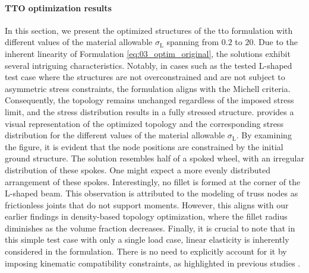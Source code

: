 \paragraph{TTO optimization results}
In this section, we present the optimized structures of the \gls{tto} formulation with different values of the material allowable $\sigma_\text{L}$ spanning from $0.2$ to $20$. Due to the inherent linearity of Formulation \ref{eq:03_optim_original}, the solutions exhibit several intriguing characteristics. Notably, in cases such as the tested L-shaped test case where the structures are not overconstrained and are not subject to asymmetric stress constraints, the formulation aligns with the Michell criteria. Consequently, the topology remains unchanged regardless of the imposed stress limit, and the stress distribution results in a fully stressed structure.  provides a visual representation of the optimized topology and the corresponding stress distribution for the different values of the material allowable $\sigma_\text{L}$. By examining the figure, it is evident that the node positions are constrained by the initial ground structure. The solution resembles half of a spoked wheel, with an irregular distribution of these spokes. One might expect a more evenly distributed arrangement of these spokes. Interestingly, no fillet is formed at the corner of the L-shaped beam. This observation is attributed to the modeling of truss nodes as frictionless joints that do not support moments. However, this aligns with our earlier findings in density-based topology optimization, where the fillet radius diminishes as the volume fraction decreases. Finally, it is crucial to note that in this simple test case with only a single load case, linear elasticity is inherently considered in the formulation. There is no need to explicitly account for it by imposing kinematic compatibility constraints, as highlighted in previous studies .
